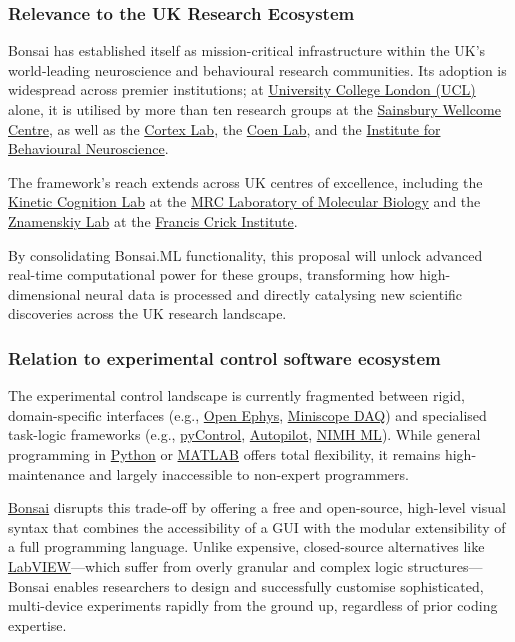 \subsubsection*{Relevance to the UK Research Ecosystem}

Bonsai has established itself as mission-critical infrastructure within the
UK’s world-leading neuroscience and behavioural research communities. Its
adoption is widespread across premier institutions; at
\href{https://www.ucl.ac.uk/}{University College London (UCL)} alone, it is
utilised by more than ten research groups at the
\href{https://www.sainsburywellcome.org/}{Sainsbury Wellcome Centre}, as well
as the \href{https://www.ucl.ac.uk/brain-sciences/cortexlab}{Cortex Lab}, the
\href{https://coen-lab.com/}{Coen Lab}, and the
\href{https://www.ibn.ucl.ac.uk/}{Institute for Behavioural Neuroscience}.

The framework's reach extends across UK centres of excellence, including the
\href{https://www.tripodilab.org/}{Kinetic Cognition Lab} at the
\href{https://www2.mrc-lmb.cam.ac.uk/}{MRC Laboratory of Molecular Biology} and
the \href{https://www.crick.ac.uk/research/labs/petr-znamenskiy}{Znamenskiy
Lab} at the \href{https://www.crick.ac.uk/}{Francis Crick Institute}.

By consolidating Bonsai.ML functionality, this proposal will unlock advanced
real-time computational power for these groups, transforming how
high-dimensional neural data is processed and directly catalysing new
scientific discoveries across the UK research landscape.

\subsubsection*{Relation to experimental control software ecosystem}

The experimental control landscape is currently fragmented between rigid,
domain-specific interfaces (e.g., \href{https://open-ephys.org}{Open Ephys},
\href{https://github.com/Aharoni-Lab/Miniscope-DAQ-Software}{Miniscope DAQ})
and specialised task-logic frameworks (e.g.,
\href{https://pycontrol.readthedocs.io/}{pyControl},
\href{https://autopilot-docs.readthedocs.io/}{Autopilot},
\href{https://monkeylogic.nimh.nih.gov/}{NIMH ML}). While general programming
in \href{https://www.python.org/}{Python} or
\href{https://www.mathworks.com/products/matlab.html}{MATLAB} offers total
flexibility, it remains high-maintenance and largely inaccessible to non-expert
programmers. 

\href{https://bonsai-rx.org/}{Bonsai} disrupts this trade-off by
offering a free and open-source, high-level visual syntax that
combines the accessibility of a GUI with the modular extensibility of a full
programming language. Unlike expensive, closed-source alternatives like
\href{https://www.ni.com/en-us/shop/labview.html}{LabVIEW}---which suffer from
overly granular and complex logic structures---Bonsai enables
researchers to design and successfully customise sophisticated, multi-device
experiments rapidly from the ground up, regardless of prior coding expertise.
